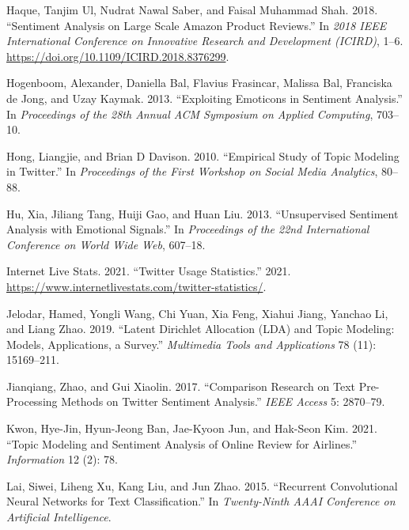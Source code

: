 \documentclass[
]{article}
\newlength{\cslhangindent}
\newlength{\cslentryspacingunit} %
\newenvironment{CSLReferences}[2] %
 {%
  \setlength{\parindent}{0pt}
  \ifodd #1
  \let\oldpar\par
  \def\par{\hangindent=\cslhangindent\oldpar}
  \fi
  \setlength{\parskip}{#2\cslentryspacingunit}
 }%
 {}
\begin{document}
\begin{CSLReferences}{1}{0}
\leavevmode{}%
Haque, Tanjim Ul, Nudrat Nawal Saber, and Faisal Muhammad Shah. 2018.
{``Sentiment Analysis on Large Scale Amazon Product Reviews.''} In
\emph{2018 IEEE International Conference on Innovative Research and
Development (ICIRD)}, 1--6.
\url{https://doi.org/10.1109/ICIRD.2018.8376299}.

\leavevmode{}%
Hogenboom, Alexander, Daniella Bal, Flavius Frasincar, Malissa Bal,
Franciska de Jong, and Uzay Kaymak. 2013. {``Exploiting Emoticons in
Sentiment Analysis.''} In \emph{Proceedings of the 28th Annual ACM
Symposium on Applied Computing}, 703--10.

\leavevmode{}%
Hong, Liangjie, and Brian D Davison. 2010. {``Empirical Study of Topic
Modeling in Twitter.''} In \emph{Proceedings of the First Workshop on
Social Media Analytics}, 80--88.

\leavevmode{}%
Hu, Xia, Jiliang Tang, Huiji Gao, and Huan Liu. 2013. {``Unsupervised
Sentiment Analysis with Emotional Signals.''} In \emph{Proceedings of
the 22nd International Conference on World Wide Web}, 607--18.

\leavevmode{}%
Internet Live Stats. 2021. {``Twitter Usage Statistics.''} 2021.
\url{https://www.internetlivestats.com/twitter-statistics/}.

\leavevmode{}%
Jelodar, Hamed, Yongli Wang, Chi Yuan, Xia Feng, Xiahui Jiang, Yanchao
Li, and Liang Zhao. 2019. {``Latent Dirichlet Allocation (LDA) and Topic
Modeling: Models, Applications, a Survey.''} \emph{Multimedia Tools and
Applications} 78 (11): 15169--211.

\leavevmode{}%
Jianqiang, Zhao, and Gui Xiaolin. 2017. {``Comparison Research on Text
Pre-Processing Methods on Twitter Sentiment Analysis.''} \emph{IEEE
Access} 5: 2870--79.

\leavevmode{}%
Kwon, Hye-Jin, Hyun-Jeong Ban, Jae-Kyoon Jun, and Hak-Seon Kim. 2021.
{``Topic Modeling and Sentiment Analysis of Online Review for
Airlines.''} \emph{Information} 12 (2): 78.

\leavevmode{}%
Lai, Siwei, Liheng Xu, Kang Liu, and Jun Zhao. 2015. {``Recurrent
Convolutional Neural Networks for Text Classification.''} In
\emph{Twenty-Ninth AAAI Conference on Artificial Intelligence}.


\end{CSLReferences}
\end{document}
